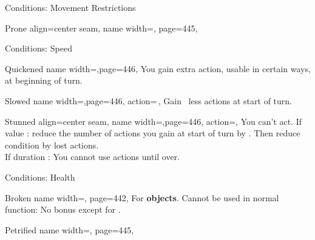 \begin{PageFrontLandscape}
\begin{TablesHalf}{\frontTableHeight}
\begin{Table}{Conditions: Movement Restrictions}
\begin{entry}{Prone}{%
                align=center seam,
                name width=\conditionLength,%
                page=445,
            }
            \end{entry}
        \end{Table}
        \TableSpace
        \begin{Table}{Conditions: Speed}
            \begin{entry}{Quickened}{%
                name width=\conditionLength,page=446,
            }
                You gain  extra action, usable in certain ways, at beginning of turn.\hfill
            \end{entry}
            \breakLine
            \begin{entry}{Slowed}{%
                name width=\conditionLength,page=446,
                action=\,\X,
            }
                Gain \X\, less actions at start of turn.
            \end{entry}
            \begin{entry}{Stunned}{%
                align=center seam,
                name width=\conditionLength,page=446,
                action=\XDur,
            }
                You can't act. \hfill
                If value \X: reduce the number of actions you gain at start of turn by \X.
                Then reduce condition by lost actions.\\
                If duration \Dur: You cannot use actions until over. \hfill
            \end{entry}
        \end{Table}
    \end{TablesHalf}%
    \begin{TablesHalf}{\frontTableHeight}
        \begin{Table}{Conditions: Health}
            \begin{entry}{Broken}{%
                name width=\conditionLength,%
                page=442,
            }
                For \textbf{objects}. Cannot be used in normal function: No \Item bonus except for . \hfill
            \end{entry}
            \begin{entry}{Petrified}{%
                name width=\conditionLength,%
                page=445,
            }

\end{entry}
\end{Table}
\end{TablesHalf}
\end{PageFrontLandscape}
